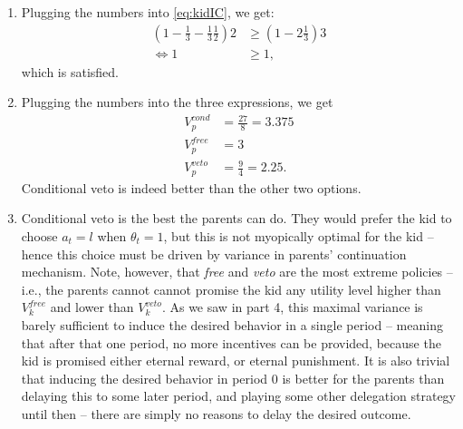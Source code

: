 \documentclass[a4paper]{article}
\begin{document}
\begin{enumerate}
		\item Plugging the numbers into \eqref{eq:kidIC}, we get:
		\begin{align*}
			\left(1-\frac{1}{3} - \frac{1}{3} \frac{1}{2} \right) 2 & \geq \left( 1 - 2\frac{1}{3} \right) 3
			\\
			\iff 1 & \geq 1,
		\end{align*}
		which is satisfied.
		
		\item Plugging the numbers into the three expressions, we get
		\begin{align*}
			V_p^{cond} &= \frac{27}{8} = 3.375
			\\
			V_p^{free} &= 3
			\\
			V_p^{veto} &= \frac{9}{4} = 2.25.
		\end{align*}
		Conditional veto is indeed better than the other two options.
		
		\item Conditional veto is the best the parents can do. They would prefer the kid to choose $a_t=l$ when $\theta_t=1$, but this is not myopically optimal for the kid -- hence this choice must be driven by variance in parents' continuation mechanism. Note, however, that \emph{free} and \emph{veto} are the most extreme policies -- i.e., the parents cannot cannot promise the kid any utility level higher than $V_k^{free}$ and lower than $V_k^{veto}$. As we saw in part 4, this maximal variance is barely sufficient to induce the desired behavior in a single period -- meaning that after that one period, no more incentives can be provided, because the kid is promised either eternal reward, or eternal punishment. It is also trivial that inducing the desired behavior in period $0$ is better for the parents than delaying this to some later period, and playing some other delegation strategy until then -- there are simply no reasons to delay the desired outcome.
	\end{enumerate}
\fi
\end{document}
